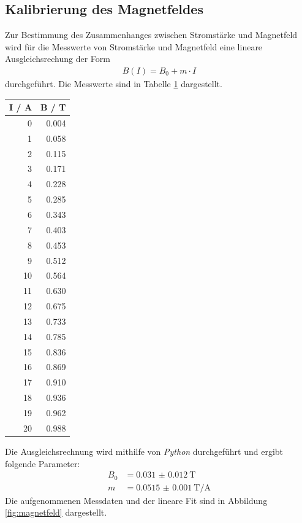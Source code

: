 \documentclass[captions=tableheading]{scrartcl}
\begin{document}
\subsection{Kalibrierung des Magnetfeldes}
Zur Bestimmung des Zusammenhanges zwischen Stromstärke und Magnetfeld wird für die Messwerte von Stromstärke und Magnetfeld eine lineare Ausgleichsrechung der Form
\begin{align}
B(I)=B_0+m\cdot I
\end{align}
durchgeführt. Die Messwerte sind in Tabelle \ref{tab:magnetfeld} dargestellt.
\begin{table}[H]
	\centering
	\label{tab:magnetfeld}
	\begin{tabular}{r r}
		\toprule
		I / A & B / T \\
		\midrule
		0 & 0.004 \\
		1 & 0.058 \\
		2 & 0.115 \\
		3 & 0.171 \\
		4 & 0.228 \\
		5 & 0.285 \\
		6 & 0.343 \\
		7 & 0.403 \\
		8 & 0.453 \\
		9 & 0.512 \\
		10 & 0.564 \\
		11 & 0.630 \\
		12 & 0.675 \\
		13 & 0.733 \\
		14 & 0.785 \\
		15 & 0.836 \\
		16 & 0.869 \\
		17 & 0.910 \\ 
		18 & 0.936 \\
		19 & 0.962 \\
		20 & 0.988 \\
		\bottomrule
	\end{tabular}
\end{table}
Die Ausgleichsrechnung wird mithilfe von \textit{Python} durchgeführt und ergibt folgende Parameter:
\begin{align*}
B_0&=\SI{0.031(12)}{\tesla} \\
m&=\SI{0.0515(10)}{\tesla\per\ampere}
\label{eq:parameter}
\end{align*}
Die aufgenommenen Messdaten und der lineare Fit sind in Abbildung \ref{fig:magnetfeld} dargestellt.
\end{document}

